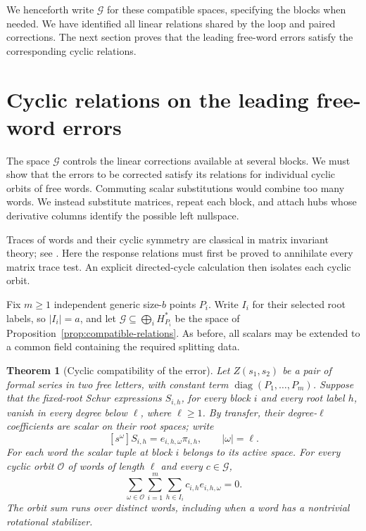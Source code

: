 \documentclass[11pt]{article}
\newtheorem{theorem}{Theorem}[section]
\theoremstyle{definition}
\theoremstyle{remark}
\numberwithin{equation}{section}
\begin{document}
We henceforth write \(\mathcal G\) for these compatible spaces,
specifying the blocks when needed. We have identified all linear
relations shared by the loop and paired corrections. The next
section proves that the leading free-word errors satisfy the
corresponding cyclic relations.

\section{Cyclic relations on the leading free-word errors}
\label{sec:cyclic-obstructions}

The space \(\mathcal G\) controls the linear corrections available
at several blocks. We must show that the errors to be corrected
satisfy its relations for individual cyclic orbits of free words.
Commuting scalar substitutions would combine too many words. We
instead substitute matrices, repeat each block, and attach hubs
whose derivative columns identify the possible left nullspace.

Traces of words and their cyclic symmetry are classical in matrix
invariant theory; see \cite[\S4]{Procesi1976}. Here the response
relations must first be proved to annihilate every matrix trace test.
An explicit directed-cycle calculation then isolates each cyclic orbit.

Fix \(m\geq1\) independent generic size-\(b\) points \(P_i\).
Write \(I_i\) for their selected root labels, so \(|I_i|=a\), and
let \(\mathcal G\subseteq\bigoplus_i H_{P_i}^*\) be the space
of Proposition~\ref{prop:compatible-relations}. As before, all
scalars may be extended to a common field containing the required
splitting data.

\begin{theorem}[Cyclic compatibility of the error]
\label{thm:cyclic-compatibility}
Let \(Z(s_1,s_2)\) be a pair of formal series in two free letters,
with constant term \(\operatorname{diag}(P_1,\ldots,P_m)\).
Suppose that the fixed-root Schur expressions \(S_{i,h}\), for
every block \(i\) and every root label \(h\), vanish in every
degree below \(\ell\), where \(\ell\geq1\).
By transfer, their degree-\(\ell\) coefficients are scalar on
their root spaces; write
\[
 [s^\omega]S_{i,h}=e_{i,h,\omega}\pi_{i,h},
 \qquad |\omega|=\ell.
\]
For each word the scalar tuple at block \(i\) belongs to its
active space. For every cyclic orbit \(\mathcal O\) of words of
length \(\ell\) and every \(c\in\mathcal G\),
\begin{equation}
 \sum_{\omega\in\mathcal O}
 \sum_{i=1}^m\sum_{h\in I_i}
 c_{i,h}e_{i,h,\omega}=0.
 \label{eq:cyclic-error-relation}
\end{equation}
The orbit sum runs over distinct words, including when a word has
a nontrivial rotational stabilizer.
\end{theorem}
\end{document}
